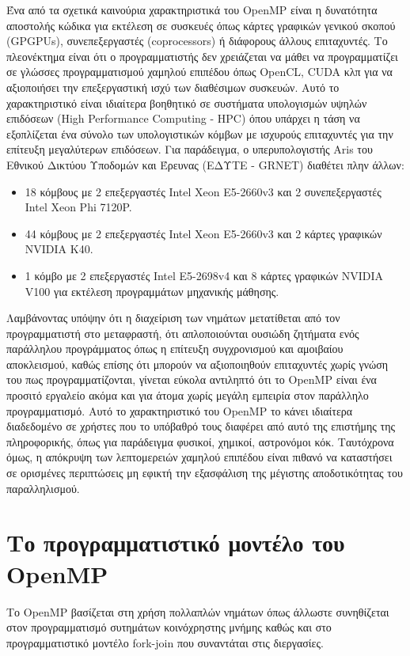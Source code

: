 Ένα από τα σχετικά καινούρια χαρακτηριστικά του OpenMP είναι η δυνατότητα αποστολής κώδικα για εκτέλεση σε συσκευές όπως κάρτες γραφικών γενικού σκοπού (GPGPUs), συνεπεξεργαστές (coprocessors) ή διάφορους άλλους επιταχυντές. Το πλεονέκτημα είναι ότι ο προγραμματιστής δεν χρειάζεται να μάθει να προγραμματίζει σε γλώσσες προγραμματισμού χαμηλού επιπέδου όπως OpenCL, CUDA κλπ για να αξιοποιήσει την επεξεργαστική ισχύ των διαθέσιμων συσκευών. Αυτό το χαρακτηριστικό είναι ιδιαίτερα βοηθητικό σε συστήματα υπολογισμών υψηλών επιδόσεων (High Performance Computing - HPC) όπου υπάρχει η τάση να εξοπλίζεται ένα σύνολο των υπολογιστικών κόμβων με ισχυρούς επιταχυντές για την επίτευξη μεγαλύτερων επιδόσεων. Για παράδειγμα, ο υπερυπολογιστής Aris του Εθνικού Δικτύου Υποδομών και Έρευνας (ΕΔΥΤΕ - GRNET) διαθέτει πλην άλλων:
\begin{itemize}
	\item 18 κόμβους με 2 επεξεργαστές Intel Xeon E5-2660v3 και 2 συνεπεξεργαστές Intel Xeon Phi 7120P.
	\item 44 κόμβους με 2 επεξεργαστές Intel Xeon E5-2660v3 και 2 κάρτες γραφικών NVIDIA K40.
	\item 1 κόμβο με 2 επεξεργαστές Intel E5-2698v4 και 8 κάρτες γραφικών NVIDIA V100 για εκτέλεση προγραμμάτων μηχανικής μάθησης.
\end{itemize}

Λαμβάνοντας υπόψην ότι η διαχείριση των νημάτων μετατίθεται από τον προγραμματιστή στο μεταφραστή, ότι απλοποιούνται ουσιώδη ζητήματα ενός παράλληλου προγράμματος όπως η επίτευξη συγχρονισμού και αμοιβαίου αποκλεισμού, καθώς επίσης ότι μπορούν να αξιοποιηθούν επιταχυντές χωρίς γνώση του πως προγραμματίζονται, γίνεται εύκολα αντιληπτό ότι το OpenMP είναι ένα προσιτό εργαλείο ακόμα και για άτομα χωρίς μεγάλη εμπειρία στον παράλληλο προγραμματισμό. Αυτό το χαρακτηριστικό του OpenMP το κάνει ιδιαίτερα διαδεδομένο σε χρήστες που το υπόβαθρό τους διαφέρει από αυτό της επιστήμης της πληροφορικής, όπως για παράδειγμα φυσικοί, χημικοί, αστρονόμοι κόκ. Ταυτόχρονα όμως, η απόκρυψη των λεπτομερειών χαμηλού επιπέδου είναι πιθανό να καταστήσει σε ορισμένες περιπτώσεις μη εφικτή την εξασφάλιση της μέγιστης αποδοτικότητας του παραλληλισμού.

\section{Το προγραμματιστικό μοντέλο του OpenMP}
Το OpenMP βασίζεται στη χρήση πολλαπλών νημάτων όπως άλλωστε συνηθίζεται στον προγραμματισμό συτημάτων κοινόχρηστης μνήμης καθώς και στο προγραμματιστικό μοντέλο fork-join που συναντάται στις διεργασίες.

